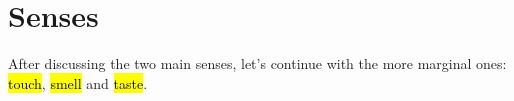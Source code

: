 \section{Senses}







\begin{paper}
	After discussing the two main senses, let’s continue with the more marginal ones: \hl{touch}, \hl{smell} and \hl{taste}.
\end{paper}






